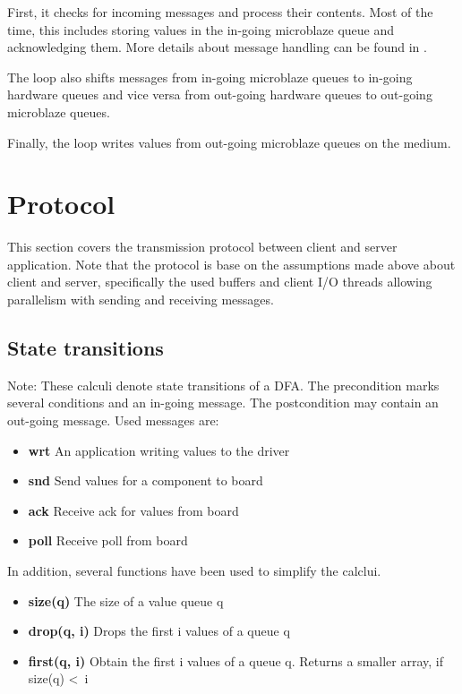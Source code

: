 \documentclass{report}
\begin{document}
First, it checks for incoming messages and process their contents. Most of the time, this includes storing values in the in-going microblaze queue and acknowledging them. More details about message handling can be found in .

The loop also shifts messages from in-going microblaze queues to in-going hardware queues and vice versa from out-going hardware queues to out-going microblaze queues. 

Finally, the loop writes values from out-going microblaze queues on the medium.

\newpage
\section{Protocol}
\label{sec:protocol}
This section covers the transmission protocol between client and server application. Note that the protocol is base on the assumptions made above about client and server, specifically the used buffers and client I/O threads allowing parallelism with sending and receiving messages.

\subsection{State transitions}

Note: These calculi denote state transitions of a DFA. The precondition marks several conditions and an in-going message. The postcondition may contain an out-going message. Used messages are:
\begin{itemize} \itemsep1pt \parskip0pt 
\item \textbf{wrt} An application writing values to the driver
\item \textbf{snd} Send values for a component to board
\item \textbf{ack} Receive ack for values from board
\item \textbf{poll} Receive poll from board
\end{itemize}

In addition, several functions have been used to simplify the calclui.
\begin{itemize} \itemsep1pt \parskip0pt 
\item \textbf{size(q)} The size of a value queue q
\item \textbf{drop(q, i)} Drops the first i values of a queue q
\item \textbf{first(q, i)} Obtain the first i values of a queue q. Returns a smaller array, if size(q) \textless ~i
\end{itemize}
\end{document}
